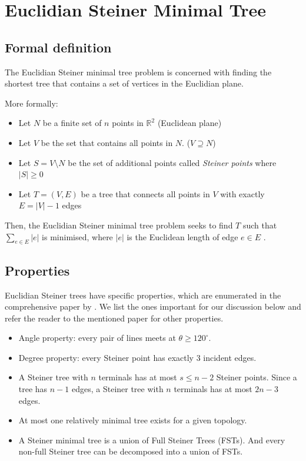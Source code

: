 \documentclass{l4proj}
\begin{document}
\section{Euclidian Steiner Minimal Tree}

\subsection{Formal definition}
The Euclidian Steiner minimal tree problem is concerned with finding the shortest tree that contains a set of vertices in the Euclidian plane.

More formally:
\begin{itemize}
      \item Let $N$ be a finite set of $n$ points in $\mathbb{R}^2$ (Euclidean plane)
      \item Let $V$ be the set that contains all points in $N$. ($V \supseteq N$)
      \item Let $S = V \setminus N$ be the set of additional points called \textit{Steiner points} where $|S| \geq 0$
      \item Let $T = (V, E)$ be a tree that connects all points in $V$ with exactly $E = |V| - 1$ edges
\end{itemize}

Then, the Euclidian Steiner minimal tree problem seeks to find $T$ such that $\sum_{e \in E} |e|$ is minimised, where $|e|$ is the Euclidean length of edge $e \in E$ \citep{Brazil2014}.

\subsection{Properties}
\label{sec:esmt_properties}
Euclidian Steiner trees have specific properties, which are enumerated in the comprehensive paper by \cite{Gilbert1968SteinerMT}. We list the ones important for our discussion below and refer the reader to the mentioned paper for other properties.
\begin{itemize}
      \item Angle property: every pair of lines meets at $\theta \geq 120^\circ$.
      \item Degree property: every Steiner point has exactly 3 incident edges.
      \item A Steiner tree with $n$ terminals has at most $s \leq n - 2$ Steiner points. Since a tree has $n - 1$ edges, a Steiner tree with $n$ terminals has at most $2n - 3$ edges.
      \item At most one relatively minimal tree exists for a given topology.
      \item A Steiner minimal tree is a union of Full Steiner Trees (FSTs). And every non-full Steiner tree can be decomposed into a union of FSTs.
\end{itemize}
\end{document}
